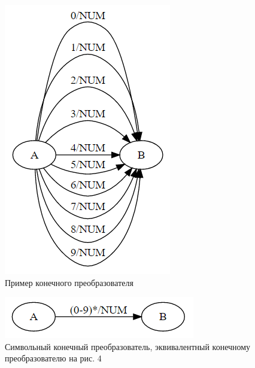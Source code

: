 \documentclass[14pt]{matmex-diploma}
\begin{document}
\begin{figure}[h!]
    \begin{center}
        \includegraphics[width=\linewidth/3]{pictures/NumFST.png}
        \caption{Пример конечного преобразователя}
        \label{fig:numfst} 
    \end{center}
\end{figure}

\begin{figure}[h!]
    \begin{center}
        \includegraphics[width=\linewidth/2]{pictures/NumST.png}
        \caption{Символьный конечный преобразователь, эквивалентный конечному преобразователю на рис. 4}
        \label{fig:numst} 
    \end{center}
\end{figure}
\end{document}
